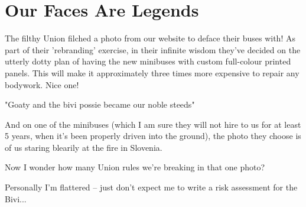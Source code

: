 \section{Our Faces Are Legends}

The filthy Union filched a photo from our website to deface their buses with! As part of their 'rebranding' exercise, in their infinite wisdom they've decided on the utterly dotty plan of having the new minibuses with
custom full-colour printed panels. This will make it approximately three times more expensive to repair any
bodywork. Nice one!

\begin{marginfigure}
      \checkoddpage \ifoddpage \forcerectofloat \else \forceversofloat \fi
      \centering
  \caption{"Goaty and the bivi possie became our noble steeds" }
\end{marginfigure}

And on one of the minibuses
(which I am sure they will not
hire to us for at least 5 years,
when it's been properly driven
into the ground), the photo
they choose is of us staring
blearily at the fire in Slovenia.

Now I wonder how many Union rules we're breaking in that one photo?

Personally I'm flattered – just
don't expect me to write a risk
assessment for the Bivi...



